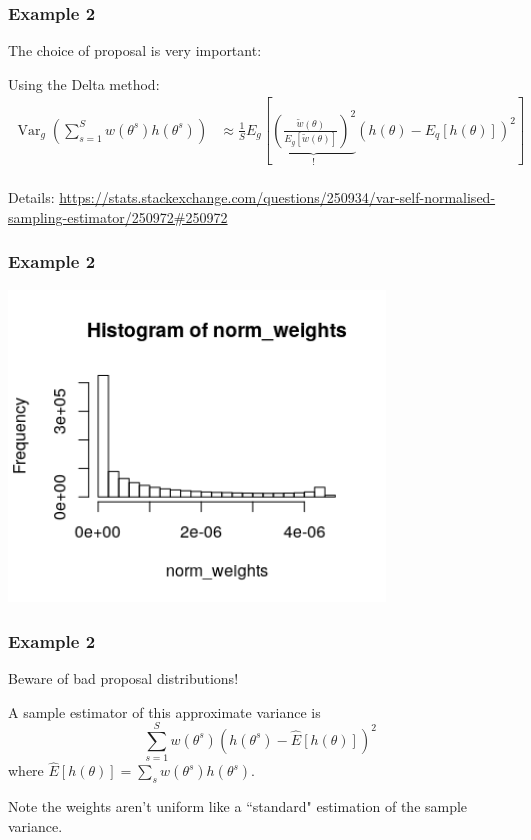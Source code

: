 \documentclass{beamer}
\begin{document}
\begin{frame}[fragile]
\frametitle{Example 2}

The choice of proposal is very important:
\newline

Using the Delta method:
\begin{align*}
\operatorname{Var}_g \left( \sum_{s=1}^S w(\theta^s) h(\theta^s) \right) &\approx \frac{1}{S} E_g\left[  \underbrace{ \left(\frac{\tilde{w}(\theta)}{ E_g[\tilde{w}(\theta)] }\right)^2 }_{\text{!} } (h(\theta) - E_q[h(\theta) ] )^2 \right]    \\
\end{align*}

Details: \url{https://stats.stackexchange.com/questions/250934/var-self-normalised-sampling-estimator/250972#250972}
\end{frame}

\begin{frame}[fragile]
\frametitle{Example 2}

\begin{center}
\includegraphics[width=100mm]{is_weights.png}
\end{center}

\end{frame}


\begin{frame}[fragile]
\frametitle{Example 2}

Beware of bad proposal distributions!
\newline

A sample estimator of this approximate variance is
\[
\sum_{s=1}^S w(\theta^s) \left( h(\theta^s) - \hat{E}[h(\theta)]  \right)^2
\]
where $\hat{E}[h(\theta)] = \sum_s w(\theta^s)h(\theta^s)$. 
\newline

Note the weights aren't uniform like a ``standard" estimation of the sample variance.

\end{frame}
\end{document}
